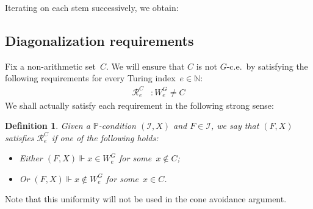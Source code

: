 \documentclass[10pt,a4paper]{article}
\def\PP{\mathbb{P}}
\def\I{\mathcal{I}}
\def\Rc{\mathcal{R}}
\newcommand{\NN}[0]{\mathbb{N}}
\newcommand{\card}{\operatorname{card}}
\def\h#1{\hat{#1}}
\numberwithin{theorem}{section}
\newtheorem{lemma}[theorem]{Lemma}
\newtheorem{definition}[theorem]{Definition}
\begin{document}
Iterating  on each stem successively, we obtain:


\subsection{Diagonalization requirements}

Fix a non-arithmetic set~$C$. We will ensure that $C$ is not $G$-c.e.\ by satisfying the following requirements for every Turing index~$e \in \NN$:
\begin{align*}
\Rc^C_e & : W^G_e \neq C
\end{align*}
We shall actually satisfy each requirement in the following strong sense:

\begin{definition}
Given a $\PP$-condition $(\I, X)$ and $F \in \I$, we say that \emph{$(F, X)$ satisfies $\Rc^C_e$} if one of the following holds:
\begin{itemize}
    \item[(1)] Either $(F, X) \Vdash x \in W^G_e$ for some~$x \not \in C$;
    \item[(2)] Or $(F, X) \Vdash x \not \in W^G_e$ for some~$x \in C$.
\end{itemize}
\end{definition}

Note that this uniformity will not be used in the cone avoidance argument.
\end{document}
